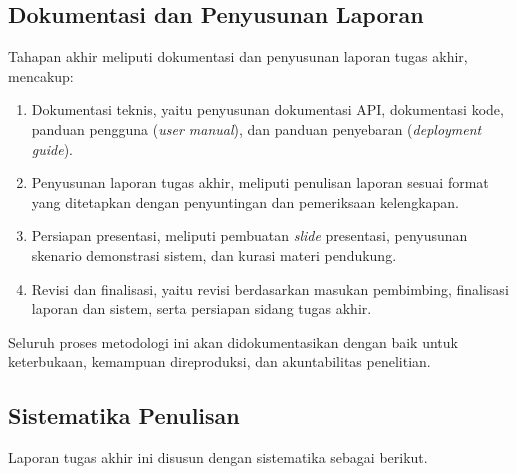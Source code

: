 \subsection{Dokumentasi dan Penyusunan Laporan}

Tahapan akhir meliputi dokumentasi dan penyusunan laporan tugas akhir, mencakup:

\begin{enumerate}[label=\alph*.]
  \item Dokumentasi teknis, yaitu penyusunan dokumentasi API, dokumentasi kode, panduan pengguna (\textit{user manual}), dan panduan penyebaran (\textit{deployment guide}).
  
  \item Penyusunan laporan tugas akhir, meliputi penulisan laporan sesuai format yang ditetapkan dengan penyuntingan dan pemeriksaan kelengkapan.
  
  \item Persiapan presentasi, meliputi pembuatan \textit{slide} presentasi, penyusunan skenario demonstrasi sistem, dan kurasi materi pendukung.
  
  \item Revisi dan finalisasi, yaitu revisi berdasarkan masukan pembimbing, finalisasi laporan dan sistem, serta persiapan sidang tugas akhir.
\end{enumerate}

Seluruh proses metodologi ini akan didokumentasikan dengan baik untuk keterbukaan, kemampuan direproduksi, dan akuntabilitas penelitian.

\subsection{Sistematika Penulisan}

Laporan tugas akhir ini disusun dengan sistematika sebagai berikut.

